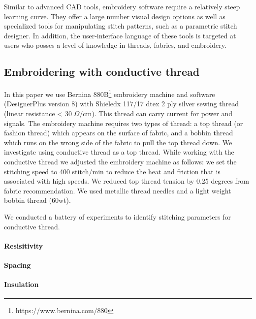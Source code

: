 \documentclass[header.tex]{subfiles}
\begin{document}
Similar to advanced CAD tools, embroidery software require a relatively steep learning curve. They offer a large number visual design options as well as specialized tools for manipulating stitch patterns, such as a parametric stitch designer. %
In addition, the user-interface language of these tools is targeted at users who posses a level of knowledge in threads, fabrics, and embroidery.


\subsection{Embroidering with conductive thread}

In this paper we use Bernina 880B\footnote{https://www.bernina.com/880} embroidery machine and software (DesignerPlus version 8) with Shieledx 117/17 dtex 2 ply silver sewing thread (linear resistance < 30 $\Omega$/cm). 
This thread can carry current for power and signals. The embroidery machine requires two types of thread: a top thread (or fashion thread) which appears on the surface of fabric, and a bobbin thread which runs on the wrong side of the fabric to pull the top thread down. We investigate using conductive thread as a top thread. While working with the conductive thread we adjusted the embroidery machine as follows: we set the stitching speed to 400 stitch/min to reduce the heat and friction that is associated with high speeds. We reduced top thread tension by 0.25 degrees from fabric recommendation. We used metallic thread needles and a light weight bobbin thread (60wt).


We conducted a battery of experiments to identify stitching parameters for conductive thread. 

\paragraph{Resisitivity}
\paragraph{Spacing}
\paragraph{Insulation}


\end{document}
